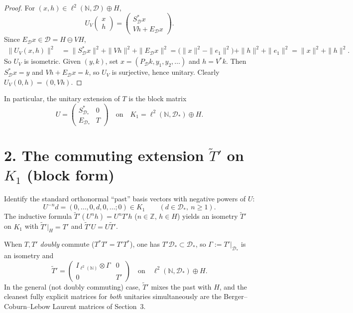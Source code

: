 \documentclass[11pt]{article}
\begin{document}
\begin{proof}
For \((x,h)\in \ell^2(\mathbb{N},\mathcal{D})\oplus H\),
\[
U_V\begin{pmatrix}x\\ h\end{pmatrix}
=
\begin{pmatrix}S_{\mathcal{D}}^*x\\ Vh+E_{\mathcal{D}}x\end{pmatrix}.
\]
Since \(E_{\mathcal{D}}x\in\mathcal{D}=H\ominus VH\),
\begin{align*}
\bigl\|U_V(x,h)\bigr\|^2
&=\|S_{\mathcal{D}}^*x\|^2+\|Vh\|^2+\|E_{\mathcal{D}}x\|^2
=\bigl(\|x\|^2-\|e_1\|^2\bigr)+\|h\|^2+\|e_1\|^2
=\|x\|^2+\|h\|^2.
\end{align*}
So \(U_V\) is isometric. Given \((y,k)\), set \(x=(P_{\mathcal{D}}k,y_1,y_2,\dots)\) and
\(h=V^*k\). Then \(S_{\mathcal{D}}^*x=y\) and \(Vh+E_{\mathcal{D}}x=k\), so \(U_V\) is
surjective, hence unitary. Clearly \(U_V(0,h)=(0,Vh)\).
\end{proof}

\noindent
In particular, the unitary extension of \(T\) is the block matrix
\begin{equation}
\label{eq:U-of-T}
U
=
\begin{pmatrix}
S_{\mathcal{D}_*}^* & 0 \\
E_{\mathcal{D}_*} & T
\end{pmatrix}
\quad\text{on}\quad
K_1=\ell^2(\mathbb{N},\mathcal{D}_*)\oplus H.
\end{equation}

\bigskip
\section*{2. The commuting extension \(\widetilde{T}'\) on \(K_1\) (block form)}

Identify the standard orthonormal ``past'' basis vectors with negative powers of \(U\):
\[
U^{-n}d=(0,\dots,0,d,0,\dots;0)\in K_1
\qquad(d\in\mathcal{D}_*,\ n\ge 1).
\]
The inductive formula \(\widetilde{T}'(U^n h)=U^n T'h\) (\(n\in\mathbb{Z}\), \(h\in H\)) yields an
isometry \(\widetilde{T}'\) on \(K_1\) with \(\widetilde{T}'\big|_H=T'\) and
\(\widetilde{T}'U=U\widetilde{T}'\).

When \(T,T'\) \emph{doubly} commute (\(T^*T'=T'T^*\)), one has
\(T'\mathcal{D}_*\subset\mathcal{D}_*\), so \(\Gamma:=T'|_{\mathcal{D}_*}\) is an isometry and
\begin{equation}
\label{eq:double-block}
\widetilde{T}'
=
\begin{pmatrix}
I_{\ell^2(\mathbb{N})}\otimes\Gamma & 0 \\
0 & T'
\end{pmatrix}
\quad\text{on}\quad
\ell^2(\mathbb{N},\mathcal{D}_*)\oplus H.
\end{equation}
In the general (not doubly commuting) case, \(\widetilde{T}'\) mixes the past with \(H\), and the
cleanest fully explicit matrices for \emph{both} unitaries simultaneously are the Berger--Coburn--Lebow
Laurent matrices of Section~3.
\end{document}
